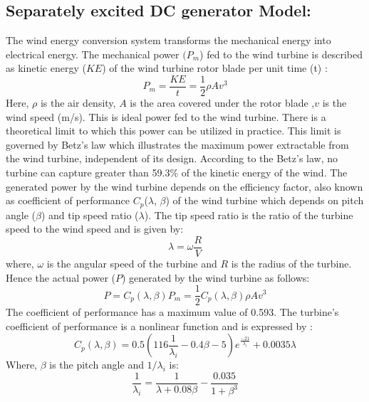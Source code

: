 \subsection{Separately excited DC generator Model:}
The wind energy conversion system transforms the mechanical energy into electrical energy. The mechanical power $(P_m$) fed to the wind turbine is described as kinetic energy ($KE$) of the wind turbine rotor blade per unit time (t) \cite{RefJ8} :
\begin{equation} \label{eq:1}
P_m =\frac{KE}{t} = \frac{1}{2} \rho  Av^3
\end{equation}
Here, $\rho$ is the air density, $A$ is the area covered under the rotor blade ,$v$ is the wind speed (m/s). This is ideal power fed to the wind turbine. There is a theoretical limit to which this power can be utilized in practice. This limit is governed by Betz’s law\cite{RefJ9} which illustrates the maximum power extractable from the wind turbine, independent of its design. According to the Betz's law, no turbine can capture greater than 59.3\% of the kinetic energy of the wind. The generated power by the wind turbine depends on the efficiency factor, also known as coefficient of performance  $C_p$($\lambda$, $\beta$) of the wind turbine which depends on pitch angle ($\beta$) and tip speed ratio ($\lambda$). The tip speed ratio is the ratio of  the turbine speed to the wind speed and is given by:
\begin{equation} \label{eq:2}
\lambda=\omega \frac{R}{V}
\end{equation}
where, $\omega$  is the angular speed of the turbine and $R$ is the radius of the turbine. Hence the actual power ($P$) generated by the wind turbine as follows:
\begin{equation} \label{eq:3}
P=C_p(\lambda,\beta)P_m = \frac{1}{2}C_p(\lambda,\beta) \rho  Av^3
\end{equation}
The coefficient of  performance has a maximum value of 0.593. The turbine’s coefficient of performance is a nonlinear function and is expressed by \cite{RefJ10}:
\begin{equation} \label{eq:4}
C_p(\lambda,\beta) = 0.5 ( 116 \frac{1}{\lambda_i} - 0.4 \beta - 5) e^\frac{-21}{\lambda_i} + 0.0035\lambda
\end{equation}
Where, $\beta$ is the pitch angle and $1/\lambda_i$ is: 
\begin{equation} \label{eq:5}
\frac{1}{\lambda_i} = \frac {1}{\lambda + 0.08 \beta} - \frac{0.035}{1+\beta^3}
\end{equation}
